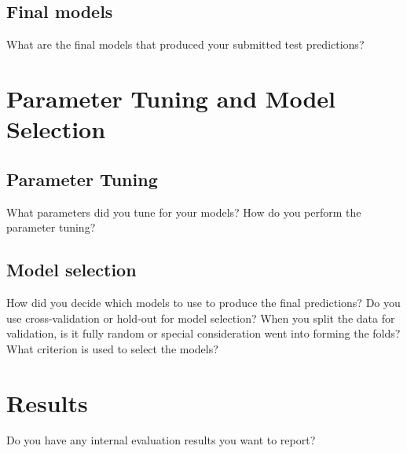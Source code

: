 \documentclass[11pt,a4paper]{article}
\begin{document}
\subsection{Final models}
What are the final models that produced your submitted test predictions?

\section{Parameter Tuning and Model Selection }
\subsection{Parameter Tuning}
What parameters did you tune for your models? How do you perform the parameter tuning?

\subsection{Model selection}
How did you decide which models to use to produce the final predictions?  Do you use cross-validation or hold-out for model selection? When you split the data for validation, is it fully random or special consideration went into forming the folds? What criterion is used to select the models?

\section{Results}
Do you have any internal evaluation results you want to report?
\end{document}
